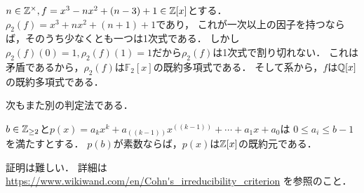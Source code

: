 \documentclass[a4j]{jsarticle}
\begin{document}
\begin{Example}
    $n \in \mathbb{Z}^{\times}, f=x^3-nx^2+(n-3)+1 \in \mathbb{Z}[x]$とする．
    $\rho_2(f)=x^3+nx^2+(n+1)+1 $であり，
    これが一次以上の因子を持つならば，そのうち少なくとも一つは1次式である．
    しかし$\rho_2(f)(0)=1, \rho_2(f)(1)=1$だから$\rho_2(f)$は1次式で割り切れない．
    これは矛盾であるから，$\rho_2(f)$は$\mathbb{F}_2[x]$の既約多項式である．
    そして系から，$f$は$\mathbb{Q}[x]$の既約多項式である．
\end{Example}

次もまた別の判定法である．
\begin{Thm}
    $b \in \mathbb{Z}_{\geq 2}$と$p(x)=a_{k}x^{k}+a_((k-1))x^((k-1))+\cdots +a_{1}x+a_{0}$は
    $0 \leq a_{i}\leq b-1$を満たすとする．
    $p(b)$が素数ならば，$p(x)$は$\mathbb{Z}[x]$の既約元である．
\end{Thm}
証明は難しい．
詳細は\url{https://www.wikiwand.com/en/Cohn's_irreducibility_criterion} を参照のこと．
\end{document}
